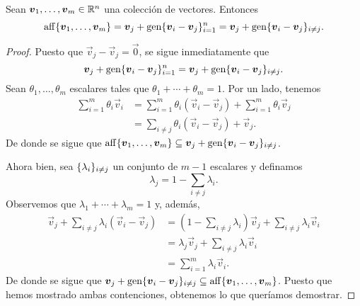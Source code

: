 \begin{lemma}
	\label{lemma:aff}
	Sean $\boldsymbol{v}_1, \ldots, \boldsymbol{v}_m \in \mathbb{R}^n$ una colección de vectores. Entonces
	\begin{equation*}
		\operatorname{aff}\lbrace \boldsymbol{v}_1, \ldots, \boldsymbol{v}_m \rbrace = \boldsymbol{v}_j + \operatorname{gen}\lbrace \boldsymbol{v}_i -
		\boldsymbol{v}_j \rbrace_{i=1}^{n} = \boldsymbol{v}_j + \operatorname{gen}\lbrace \boldsymbol{v}_i - \boldsymbol{v}_j \rbrace_{i\neq j}.
	\end{equation*}
\end{lemma}
\begin{proof}
	Puesto que $\vec{v}_j - \vec{v}_j = \vec{0}$, se sigue inmediatamente que
	\begin{equation*}
		\boldsymbol{v}_j + \operatorname{gen}\lbrace \boldsymbol{v}_i - \boldsymbol{v}_j \rbrace_{i = 1}^{n}
		=
		\boldsymbol{v}_j + \operatorname{gen}\lbrace \boldsymbol{v}_i - \boldsymbol{v}_j \rbrace_{i \neq j}.
	\end{equation*}
	Sean $\theta_1, \ldots, \theta_m$ escalares tales que $\theta_1 + \cdots + \theta_m = 1$. Por un
	lado, tenemos
	\begin{align*}
		\sum_{i=1}^{m}\theta_i\vec{v}_i
		&= \sum_{i=1}^{m}\theta_i(\vec{v}_i - \vec{v}_j) + \sum_{i=1}^{m}\theta_i\vec{v}_j \\
		&= \sum_{i \neq j}\theta_i(\vec{v}_i - \vec{v}_j) + \vec{v}_j.
	\end{align*}
	De donde se sigue que $\operatorname{aff}\lbrace \boldsymbol{v}_1, \ldots, \boldsymbol{v}_m \rbrace \subseteq \boldsymbol{v}_j +
	\operatorname{gen}\lbrace \boldsymbol{v}_i - \boldsymbol{v}_j \rbrace_{i \neq j}$.

	Ahora bien, sea $\lbrace \lambda_i \rbrace_{i \neq j}$ un conjunto de $m - 1$ escalares y definamos
	\begin{equation*}
		\lambda_j = 1 - \sum_{i \neq j}\lambda_i.
	\end{equation*}
	Observemos que $\lambda_1 + \cdots + \lambda_m = 1$ y, además,
	\begin{align*}
		\vec{v}_j + \sum_{i \neq j}\lambda_i(\vec{v}_i - \vec{v}_j)
		&= \left(1 - \sum_{i \neq j}\lambda_i\right)\vec{v}_j
		+ \sum_{i \neq j}\lambda_i\vec{v}_i \\
		&= \lambda_j\vec{v}_j + \sum_{i \neq j}\lambda_i\vec{v}_i \\
		&= \sum_{i = 1}^{m}\lambda_i\vec{v}_i.
	\end{align*}
	De donde se sigue que $\boldsymbol{v}_j + \operatorname{gen}\lbrace \boldsymbol{v}_i - \boldsymbol{v}_j \rbrace_{i \neq j} \subseteq
	\operatorname{aff}\lbrace \boldsymbol{v}_1, \ldots, \boldsymbol{v}_m \rbrace$. Puesto que hemos mostrado ambas contenciones,
	obtenemos lo que queríamos demostrar.
\end{proof}
